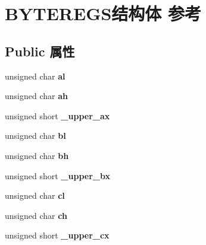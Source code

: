 \hypertarget{struct_b_y_t_e_r_e_g_s}{}\section{B\+Y\+T\+E\+R\+E\+G\+S结构体 参考}
\label{struct_b_y_t_e_r_e_g_s}
\subsection*{Public 属性}
\begin{DoxyCompactItemize}
\item 
\mbox{\label{struct_b_y_t_e_r_e_g_s_a980c1a033cc95616694a87586d0cbc10}} 
unsigned char {\bfseries al}
\item 
\mbox{\label{struct_b_y_t_e_r_e_g_s_ad43a7c4784f5a8cabd3b78223b70b867}} 
unsigned char {\bfseries ah}
\item 
\mbox{\label{struct_b_y_t_e_r_e_g_s_a19236ce6a64ac217898cd1a21a7f1f53}} 
unsigned short {\bfseries \+\_\+upper\+\_\+ax}
\item 
\mbox{\label{struct_b_y_t_e_r_e_g_s_a30b6486d130b1f4e03464a2cb14bdbdf}} 
unsigned char {\bfseries bl}
\item 
\mbox{\label{struct_b_y_t_e_r_e_g_s_af38db26bb733e2256b5c37c95938c44d}} 
unsigned char {\bfseries bh}
\item 
\mbox{\label{struct_b_y_t_e_r_e_g_s_a010b467de64dcf818545a4405be326f0}} 
unsigned short {\bfseries \+\_\+upper\+\_\+bx}
\item 
\mbox{\label{struct_b_y_t_e_r_e_g_s_a4a5ea1022deab861db7b572462130a8d}} 
unsigned char {\bfseries cl}
\item 
\mbox{\label{struct_b_y_t_e_r_e_g_s_a322dee374ee22786408e12978515e895}} 
unsigned char {\bfseries ch}
\item 
\mbox{\label{struct_b_y_t_e_r_e_g_s_a011a371562ba7e41728bcf6b214f101a}} 
unsigned short {\bfseries \+\_\+upper\+\_\+cx}

\end{DoxyCompactItemize}
